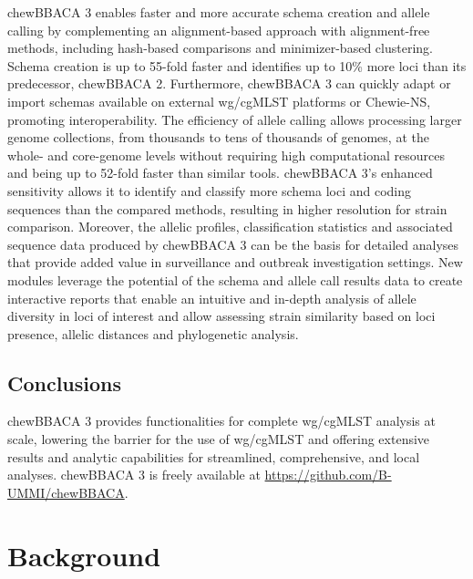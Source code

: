 chewBBACA 3 enables faster and more accurate schema creation and allele calling by complementing an alignment-based approach with alignment-free methods, including hash-based comparisons and minimizer-based clustering. Schema creation is up to 55-fold faster and identifies up to 10\% more loci than its predecessor, chewBBACA 2. Furthermore, chewBBACA 3 can quickly adapt or import schemas available on external \ac{wg/cgMLST} platforms or Chewie-NS, promoting interoperability. The efficiency of allele calling allows processing larger genome collections, from thousands to tens of thousands of genomes, at the whole- and core-genome levels without requiring high computational resources and being up to 52-fold faster than similar tools. chewBBACA 3’s enhanced sensitivity allows it to identify and classify more schema loci and coding sequences than the compared methods, resulting in higher resolution for strain comparison. Moreover, the allelic profiles, classification statistics and associated sequence data produced by chewBBACA 3 can be the basis for detailed analyses that provide added value in surveillance and outbreak investigation settings. New modules leverage the potential of the schema and allele call results data to create interactive reports that enable an intuitive and in-depth analysis of allele diversity in loci of interest and allow assessing strain similarity based on loci presence, allelic distances and phylogenetic analysis.

\subsection{Conclusions} \label{ssec:ch2_abstract_conclusions}

chewBBACA 3 provides functionalities for complete \ac{wg/cgMLST} analysis at scale, lowering the barrier for the use of \ac{wg/cgMLST} and offering extensive results and analytic capabilities for streamlined, comprehensive, and local analyses. chewBBACA 3 is freely available at \url{https://github.com/B-UMMI/chewBBACA}.

\section{Background} \label{sec:ch2_background}

